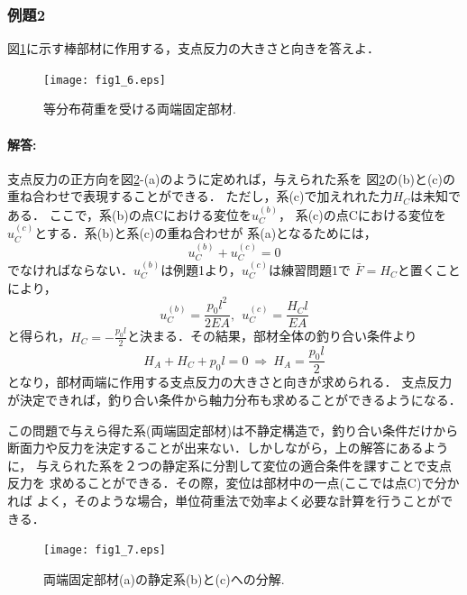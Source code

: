 \documentclass[10pt,a4j]{jarticle}
\begin{document}
\subsubsection{例題2}
図\ref{fig:fig1_6}に示す棒部材に作用する，支点反力の大きさと向きを答えよ．
\begin{figure}[h]
	\begin{center}
	\texttt{[image: fig1\_6.eps]} 
	\end{center}
	\caption{等分布荷重を受ける両端固定部材.} 
	\label{fig:fig1_6}
\end{figure}
\paragraph{解答:}
支点反力の正方向を図\ref{fig:fig1_7}-(a)のように定めれば，与えられた系を
図\ref{fig:fig1_7}の(b)と(c)の重ね合わせで表現することができる．
ただし，系(c)で加えれれた力$H_C$は未知である．
ここで，系(b)の点Cにおける変位を$u_C^{(b)}$，
系(c)の点Cにおける変位を$u_C^{(c)}$とする．系(b)と系(c)の重ね合わせが
系(a)となるためには，
\[
	u_C^{(b)}+u_C^{(c)}=0
\]
でなければならない．$u_C^{(b)}$は例題1より，$u_C^{(c)}$は練習問題1で
$\bar{F}=H_C$と置くことにより，
\[
	u_C^{(b)}=\frac{p_0l^2}{2EA}
	, \ \ 	
	u_C^{(c)}=\frac{H_Cl}{EA}
\]
と得られ，$H_C=-\frac{p_0l}{2}$と決まる．その結果，部材全体の釣り合い条件より
\[
	H_A+H_C+p_0l=0 \ \Rightarrow \ H_A=\frac{p_0l}{2}
\]
となり，部材両端に作用する支点反力の大きさと向きが求められる．
支点反力が決定できれば，釣り合い条件から軸力分布も求めることができるようになる．

この問題で与えら得た系(両端固定部材)は不静定構造で，釣り合い条件だけから
断面力や反力を決定することが出来ない．しかしながら，上の解答にあるように，
与えられた系を２つの静定系に分割して変位の適合条件を課すことで支点反力を
求めることができる．その際，変位は部材中の一点(ここでは点C)で分かれば
よく，そのような場合，単位荷重法で効率よく必要な計算を行うことができる．
\begin{figure}[h]
	\begin{center}
	\texttt{[image: fig1\_7.eps]} 
	\end{center}
	\caption{両端固定部材(a)の静定系(b)と(c)への分解.} 
	\label{fig:fig1_7}
\end{figure}
\end{document}
